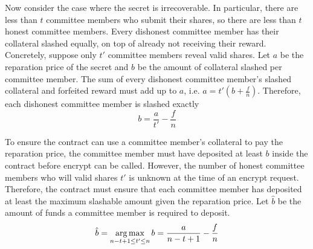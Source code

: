 Now consider the case where the secret is irrecoverable.
In particular, there are less than $t$ committee members who submit their shares, so there are less than $t$ honest committee members.
Every dishonest committee member has their collateral slashed equally, on top of already not receiving their reward.
Concretely, suppose only $t'$ committee members reveal valid shares.
Let $a$ be the reparation price of the secret and $b$ be the amount of collateral slashed per committee member.
The sum of every dishonest committee member's slashed collateral and forfeited reward must add up to $a$, i.e. $a = t'(b + \frac{f}{n})$.
Therefore, each dishonest committee member is slashed exactly
\begin{equation}
    b = \frac{a}{t'} - \frac{f}{n}
\end{equation}

To ensure the contract can use a committee member's collateral to pay the reparation price, the committee member must have deposited at least $b$ inside the contract before \textsf{encrypt} can be called.
However, the number of honest committee members who will valid shares $t'$ is unknown at the time of an \textsf{encrypt} request.
Therefore, the contract must ensure that each committee member has deposited at least the maximum slashable amount given the reparation price.
Let $\hat{b}$ be the amount of funds a committee member is required to deposit.
\begin{equation}\label{eq:collateral_requirement}
    \hat{b} = \operatorname*{arg\,max}_{n - t + 1 \leq t' \leq n} b = \frac{a}{n - t + 1} - \frac{f}{n}
\end{equation}

